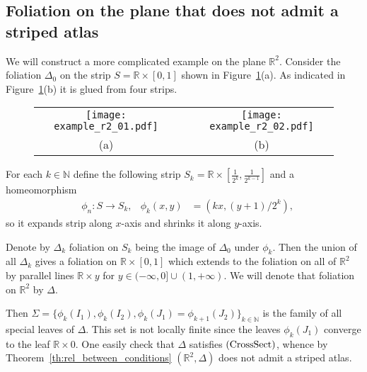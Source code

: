 \documentclass[12pt, reqno]{amsart}
\newcommand{\bR}{\mathbb{R}}
\newcommand{\bN}{\mathbb{N}}
\newcommand{\Partition}{\Delta}
\newcommand{\strip}{S}
\begin{document}
\subsection{Foliation on the plane that does not admit a striped atlas}
We will construct a more complicated example on the plane $\bR^2$.
Consider the foliation $\Partition_0$ on the strip $\strip = \bR\times[0,1]$ shown in Figure~\ref{fig:example_on_r2}(a).
As indicated in Figure~\ref{fig:example_on_r2}(b) it is glued from four strips.
\begin{figure}[h]
\begin{tabular}{ccc}
\texttt{[image: example\_r2\_01.pdf]} & \qquad\qquad &
\texttt{[image: example\_r2\_02.pdf]} \\
(a) & & (b)
\end{tabular}
\caption{}\label{fig:example_on_r2}
\end{figure}
For each $k\in\bN$ define the following strip $\strip_k=\bR\times[\tfrac{1}{2^{k}}, \tfrac{1}{2^{k-1}}]$ and a homeomorphism 
\begin{align*}
&\phi_n:\strip \to \strip_k, &
\phi_k(x,y) &= (k x, (y+1)/ 2^{k} ),
\end{align*}
so it expands strip along $x$-axis and shrinks it along $y$-axis.

Denote by $\Partition_k$ foliation on $\strip_k$ being the image of $\Partition_0$ under $\phi_k$.
Then the union of all $\Partition_k$ gives a foliation on $\bR\times[0,1]$ which extends to the foliation on all of $\bR^2$ by parallel lines $\bR\times y$ for $y\in(-\infty,0]\cup(1,+\infty)$.
We will denote that foliation on $\bR^2$ by $\Partition$.

Then $\Sigma = \{ \phi_k(I_1), \phi_k(I_2), \phi_k(J_1) = \phi_{k+1}(J_2) \}_{k\in\bN}$ is the family of all special leaves of $\Partition$.
This set is not locally finite since the leaves $\phi_k(J_1)$ converge to the leaf $\bR\times 0$.
One easily check that $\Partition$ satisfies $\mathrm{(CrossSect)}$, whence by Theorem~\ref{th:rel_between_conditions} $(\bR^2,\Partition)$ does not admit a striped atlas.
\end{document}
